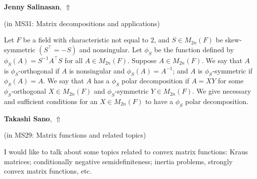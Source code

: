 \documentclass[ILAS2025-program.tex]{subfiles}
\begin{document}
     \hypertarget{down0276}{}\begin{ilasabstract}
    
    \textbf{Jenny Salinasan},  \hfill \hyperlink{up0276}{$\Uparrow$}
    
    (in {\color{mstitle}MS31: Matrix decompositions and applications})
        
        \mtskip
    Let $F$ be a field with characteristic not equal to $2$, and $S \in M_{2n}(F)$ be skew-symmetric $(S^{\top}=-S)$ and nonsingular.
Let $\phi_S$ be the function defined by $\phi_S(A)=S^{-1}A^{\top}S$ for all $A \in M_{2n}(F)$.
Suppose $A \in M_{2n}(F)$.
We say that $A$ is $\phi_S$-orthogonal if $A$ is nonsingular and $\phi_S(A)=A^{-1}$; and $A$ is $\phi_S$-symmetric if $\phi_S(A)=A$.
We say that $A$ has a $\phi_S$ polar decomposition if $A=XY$ for some $\phi_S$-orthogonal $X \in M_{2n}(F)$ and $\phi_S$-symmetric $Y \in M_{2n}(F)$.
We give necessary and sufficient conditions for an $X \in M_{2n}(F)$ to have a $\phi_S$ polar decomposition.\end{ilasabstract}
     \hypertarget{down0125}{}\begin{ilasabstract}
    
    \textbf{Takashi Sano},  \hfill \hyperlink{up0125}{$\Uparrow$}
    
    (in {\color{mstitle}MS29: Matrix functions and related topics})
        
        \mtskip
    I would like to talk about some topics related to convex matrix functions: 
Kraus matrices; conditionally negative semidefiniteness; inertia problems, strongly convex matrix functions, etc. 
\end{ilasabstract}
\end{document}
